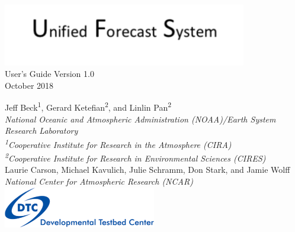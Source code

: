 \begin{titlepage}
{}
\noindent
   \begin{center}     

      \includegraphics[width=0.8\textwidth]{images/UFSbanner.png}\\[2em]
     {\color{darkcerulean}
        \Huge{User's Guide Version 1.0 }\\[1em]       
        \normalsize{October 2018}\\[5em] 
       }
 
      \normalsize{Jeff Beck\textsuperscript{1}, Gerard Ketefian\textsuperscript{2}, and Linlin Pan\textsuperscript{2}}\\ 
      \textit{\small{National Oceanic and Atmospheric Administration (NOAA)/Earth System Research Laboratory}}\\
      \textit{\small{\textsuperscript{1}Cooperative Institute for Research in the Atmosphere (CIRA)}}\\
      \textit{\small{\textsuperscript{2}Cooperative Institute for Research in Environmental Sciences (CIRES)}}\\[2em]
      \normalsize{Laurie Carson, Michael Kavulich, Julie Schramm, Don Stark, and Jamie Wolff}\\
      \textit{\small{National Center for Atmospheric Research (NCAR)}}\\[4em]
    
       \includegraphics[width=0.5\textwidth]{images/DTClogo.png}\\
         
      \vspace{1em}

   \end{center}
   \restoregeometry
\end{titlepage}
\pagebreak{}




